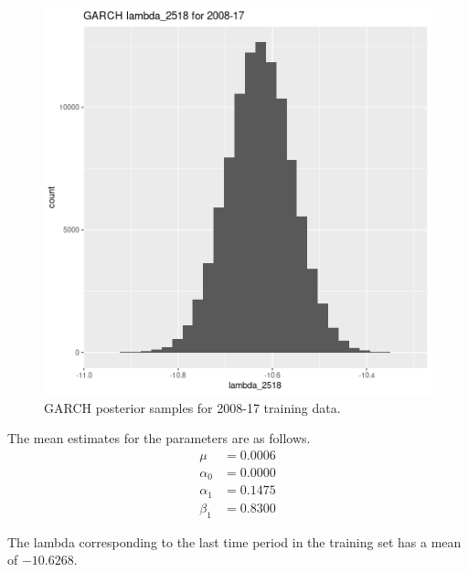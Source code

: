 \documentclass[12pt,letterpaper,reqno,fleqn]{article}
\begin{document}
\begin{figure}
\includegraphics[scale = .4]{glT0817}
\caption{GARCH posterior samples for 2008-17 training data.}
\end{figure}

The mean estimates for the parameters are as follows.
\begin{align*}
\mu &= 0.0006 \\ 
\alpha_0 &= 0.0000 \\ 
\alpha_1 &= 0.1475 \\ 
\beta_1 &= 0.8300 
\end{align*}

The lambda corresponding to the last time period in the training set has a mean of $-10.6268$.
\end{document}
